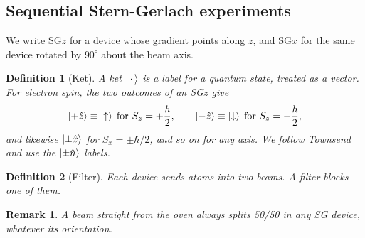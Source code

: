 \documentclass{article}
\newtheorem{definition}{Definition}
\newtheorem{remark}{Remark}
\begin{document}
\subsection{Sequential Stern-Gerlach experiments}
We write SG$z$ for a device whose gradient points along $z$, and SG$x$ for the same device rotated by $90^\circ$ about the beam axis.
\begin{definition}[Ket]
    \label{Ket-def}
    A ket $\ket{\,\cdot\,}$ is a label for a quantum state, treated as a vector. For electron spin, the two outcomes of an SG$z$ give
    \[\ket{+\hat{z}} \equiv \ket{\uparrow} \; \text{for } S_{z} = +\frac{\hbar}{2}, \qquad \ket{-\hat{z}} \equiv \ket{\downarrow} \; \text{for } S_{z} = -\frac{\hbar}{2},\]
    and likewise $\ket{\pm\hat{x}}$ for $S_x = \pm\hbar/2$, and so on for any axis. We follow Townsend and use the $\ket{\pm\hat{n}}$ labels.
\end{definition}
\begin{definition}[Filter]
    Each device sends atoms into two beams. A filter blocks one of them.
\end{definition}
\begin{remark}
    A beam straight from the oven always splits 50/50 in any SG device, whatever its orientation.
\end{remark}
\end{document}
